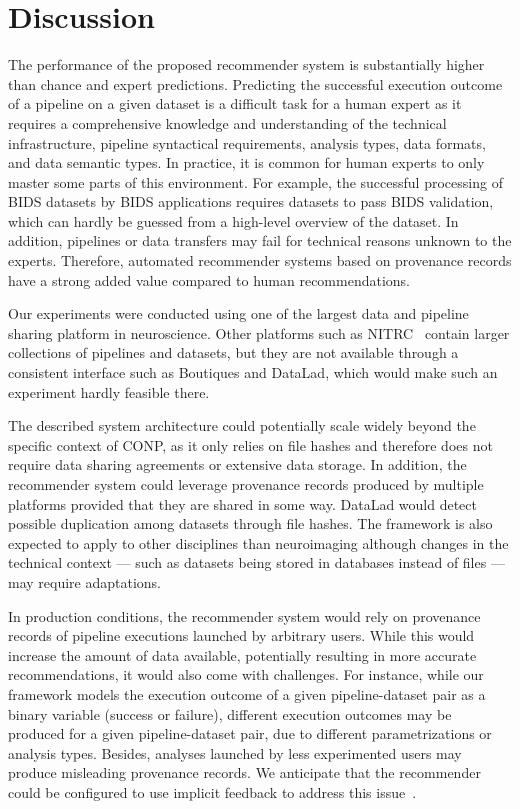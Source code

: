 \documentclass[conference]{IEEEtran}
\begin{document}
\section{Discussion}


The performance of the proposed recommender system is substantially higher
than chance and expert predictions. Predicting the successful execution
outcome of a pipeline on a given dataset is a difficult task for a human expert as it requires a comprehensive knowledge and understanding of the technical infrastructure, pipeline syntactical requirements, analysis types, data formats, and data semantic types. In practice, it is common for human experts to only master some parts of this environment. For example,
the successful processing of BIDS datasets by BIDS applications requires
datasets to pass BIDS validation, which can hardly be guessed from a
high-level overview of the dataset. 
In addition, pipelines or data
transfers may fail for technical reasons unknown to the experts. Therefore, automated
recommender systems based on provenance records have a strong added value
compared to human recommendations. 

Our experiments were conducted using one of the largest data and pipeline
sharing platform in neuroscience. Other platforms such as
NITRC~\cite{kennedy2016nitrc} contain larger collections of
pipelines and datasets, but they are not available through a consistent
interface such as Boutiques and DataLad, which would make
such an experiment hardly feasible there.

The described system architecture could potentially scale widely beyond the specific
context of CONP, as it only relies on file hashes and therefore does not
require data sharing agreements or extensive data storage. In addition, the
recommender system could leverage provenance records produced by multiple
platforms provided that they are shared in some way.
DataLad would detect possible duplication among datasets through file hashes. 
The framework is also expected to apply to other disciplines than neuroimaging
although changes in the technical context --- such as datasets being stored in 
databases instead of files --- may require adaptations.

In production conditions, the recommender system would rely on provenance
records of pipeline executions launched by arbitrary users. While this would increase
the amount of data available, potentially resulting in more accurate
recommendations, it would also come with challenges. For instance, while
our framework models the execution outcome of a given pipeline-dataset pair
as a binary variable (success or failure), different execution outcomes may
be produced for a given pipeline-dataset pair, due to different
parametrizations or analysis types. Besides, analyses launched by less
experimented users may produce misleading provenance records. We anticipate
that the recommender could be configured to use implicit feedback to address 
this issue~\cite{hu2008collaborative}.
\end{document}
